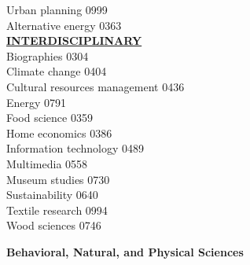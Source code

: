 \documentclass[9pt,twoside]{article}
\newcommand{\categoryheading}[1]{{\fontsize{8}{11}\selectfont \textbf{\uline{#1}}}}
\newcommand{\fieldheading}[1]{{\large \textbf{#1}}}
\begin{document}
\begin{multicols}{3}
Urban planning \hfill 0999 \leavevmode \\
Alternative energy \hfill 0363 \leavevmode \\
\columnbreak
\categoryheading{INTERDISCIPLINARY} \leavevmode \\
Biographies \hfill 0304 \leavevmode \\
Climate change \hfill 0404 \leavevmode \\
Cultural resources management \hfill 0436 \leavevmode \\
Energy \hfill 0791 \leavevmode \\
Food science \hfill 0359 \leavevmode \\
Home economics \hfill 0386 \leavevmode \\
Information technology \hfill 0489 \leavevmode \\
Multimedia \hfill 0558 \leavevmode \\
Museum studies \hfill 0730 \leavevmode \\
Sustainability \hfill 0640 \leavevmode \\
Textile research \hfill 0994 \leavevmode \\
Wood sciences \hfill 0746 \leavevmode \\
\end{multicols}
\clearpage
\fieldheading{Behavioral, Natural, and Physical Sciences}
\end{document}
